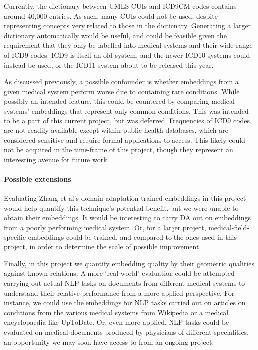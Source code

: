 \documentclass[10pt]{article}
\begin{document}
Currently, the dictionary between UMLS CUIs and ICD9CM codes contains around 40,000 entries. As such, many CUIs could not be used, despite representing concepts very related to those in the dictionary. Generating a larger dictionary automatically would be useful, and could be feasible given the requirement that they only be labelled into medical systems and their wide range of ICD9 codes. ICD9 is itself an old system, and the newer ICD10 systems could instead be used, or the ICD11 system about to be released this year.  

As discussed previously, a possible confounder is whether embeddings from a given medical system perform worse due to containing rare conditions. While possibly an intended feature, this could be countered by comparing medical systems' embeddings that represent only common conditions. This was intended to be a part of this current project, but was deferred. Frequencies of ICD9 codes are not readily available except within public health databases, which are considered sensitive and require formal applications to access. This likely could not be acquired in the time-frame of this project, though they represent an interesting avenue for future work. 
 
\paragraph{Possible extensions}

Evaluating Zhang et al's domain adaptation-trained embeddings in this project would help quantify this technique's potential benefit, but we were unable to obtain their embeddings. It would be interesting to carry DA out on embeddings from a poorly performing medical system. Or, for a larger project, medical-field-specific embeddings could be trained, and compared to the ones used in this project, in order to determine the scale of possible improvement. 

Finally, in this project we quantify embedding quality by their geometric qualities against known relations. A more `real-world' evaluation could be attempted carrying out actual NLP tasks on documents from different medical systems to understand their relative performance from a more applied perspective. For instance, we could use the embeddings for NLP tasks carried out on articles on conditions from the various medical systems from Wikipedia or a medical encyclopaedia like UpToDate. Or, even more applied, NLP tasks could be evaluated on medical documents produced by physicians of different specialities, an opportunity we may soon have access to from an ongoing project. 
\end{document}
